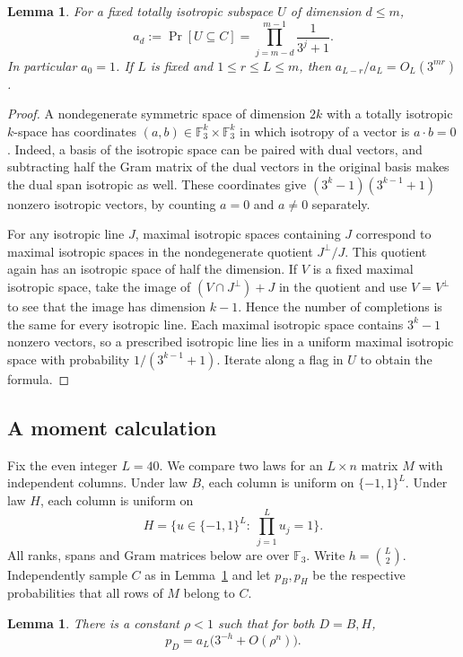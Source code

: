 \documentclass[11pt]{article}
\newtheorem{lemma}[theorem]{Lemma}
\newcommand{\F}{\mathbb F_3}
\newcommand{\Cube}{\{-1,1\}}
\begin{document}
\begin{lemma}\label{lem:inclusion}
For a fixed totally isotropic subspace $U$ of dimension $d\le m$,
\[
 a_d:=\Pr[U\subseteq C]
     =\prod_{j=m-d}^{m-1}\frac{1}{3^j+1}.
\]
In particular $a_0=1$. If $L$ is fixed and $1\le r\le L\le m$, then
$a_{L-r}/a_L=O_L(3^{mr})$.
\end{lemma}

\begin{proof}
A nondegenerate symmetric space of dimension $2k$ with a totally
isotropic $k$-space has coordinates $(a,b)\in\F^k\times\F^k$ in
which isotropy of a vector is $a\cdot b=0$. Indeed, a basis of the
isotropic space can be paired with dual vectors, and subtracting half
the Gram matrix of the dual vectors in the original basis makes the
dual span isotropic as well. These coordinates give
$(3^k-1)(3^{k-1}+1)$ nonzero isotropic vectors, by counting $a=0$
and $a\ne0$ separately.

For any isotropic line $J$, maximal isotropic spaces containing $J$
correspond to maximal isotropic spaces in the nondegenerate quotient
$J^\perp/J$. This quotient again has an isotropic space of half the
dimension. If $V$ is a fixed maximal isotropic space, take the image of
$(V\cap J^\perp)+J$ in the quotient and use $V=V^\perp$ to see that the
image has dimension $k-1$. Hence the number of completions is the same
for every isotropic line. Each maximal isotropic space contains
$3^k-1$ nonzero vectors, so a prescribed isotropic line lies in a
uniform maximal isotropic space with probability $1/(3^{k-1}+1)$.
Iterate along a flag in $U$ to obtain the formula.
\end{proof}

\subsection{A moment calculation}

Fix the even integer $L=40$. We compare two laws for an $L\times n$
matrix $M$ with independent columns. Under law $B$, each column is
uniform on $\Cube^L$. Under law $H$, each column is uniform on
\[
 H=\bigl\{u\in\Cube^L:\ \textstyle\prod_{j=1}^L u_j=1\bigr\}.
\]
All ranks, spans and Gram matrices below are over $\F$. Write
$h=\binom L2$. Independently sample $C$ as in
Lemma~\ref{lem:inclusion} and let $p_B,p_H$ be the respective
probabilities that all rows of $M$ belong to $C$.

\begin{lemma}\label{lem:comparison}
There is a constant $\rho<1$ such that for both $D=B,H$,
\[
 p_D=a_L\bigl(3^{-h}+O(\rho^n)\bigr).
\]
\end{lemma}
\end{document}
